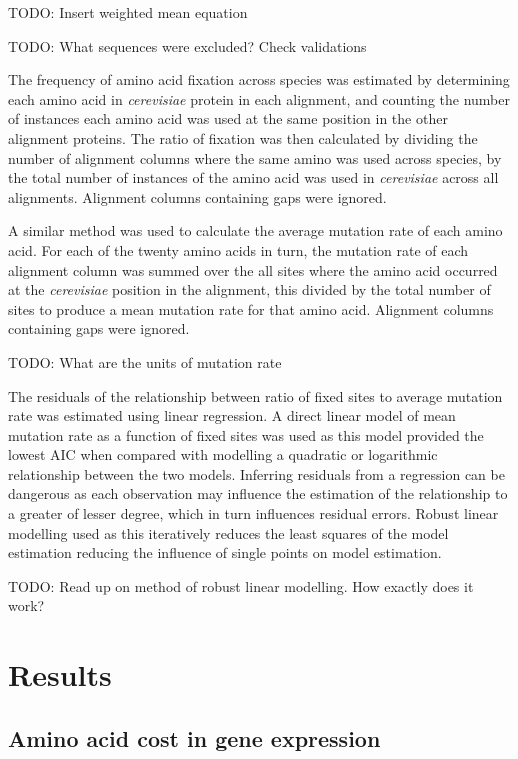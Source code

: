 TODO: Insert weighted mean equation

TODO: What sequences were excluded? Check validations

The frequency of amino acid fixation across species was estimated by determining each amino acid in \emph{cerevisiae} protein in each alignment, and counting the number of instances each amino acid was used at the same position in the other alignment proteins. The ratio of fixation was then calculated by dividing the number of alignment columns where the same amino was used across species, by the total number of instances of the amino acid was used in \emph{cerevisiae} across all alignments. Alignment columns containing gaps were ignored.

A similar method was used to calculate the average mutation rate of each amino acid. For each of the twenty amino acids in turn, the mutation rate of each alignment column was summed over the all sites where the amino acid occurred at the \emph{cerevisiae} position in the alignment, this divided by the total number of sites to produce a mean mutation rate for that amino acid. Alignment columns containing gaps were ignored.

TODO: What are the units of mutation rate

The residuals of the relationship between ratio of fixed sites to average mutation rate was estimated using linear regression. A direct linear model of mean mutation rate as a function of fixed sites was used as this model provided the lowest AIC when compared with modelling a quadratic or logarithmic relationship between the two models. Inferring residuals from a regression can be dangerous as each observation may influence the estimation of the relationship to a greater of lesser degree, which in turn influences residual errors. Robust linear modelling used as this iteratively reduces the least squares of the model estimation reducing the influence of single points on model estimation.

TODO: Read up on method of robust linear modelling. How exactly does it work?

\clearpage

\section{Results}

\subsection{Amino acid cost in gene expression}

